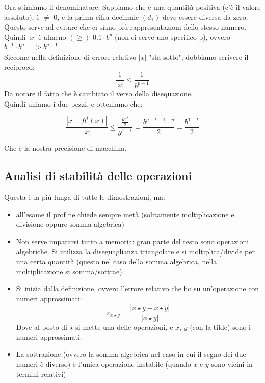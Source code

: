 Ora stimiamo il denominatore. Sappiamo che è una quantità positiva (c'è il valore assoluto), è $\neq$ 0, e la prima cifra decimale $(d_1)$ deve essere diversa da zero. Questo serve ad evitare che ci siano più rappresentazioni dello stesso numero.\\
Quindi $|x|$ è almeno $(\geq)$ $0.1 \cdot b^p$ (non ci serve uno specifico p), ovvero $b^{-1}\cdot b^p => b^{p-1}$.\\
Siccome nella definizione di errore relativo $|x|$ "sta sotto", dobbiamo scrivere il reciproco: 
\begin{displaymath}\frac{1}{|x|}\leq \frac{1}{b^{p-1}}\end{displaymath}
Da notare il fatto che è cambiato il verso della disequazione.\\
Quindi uniamo i due pezzi, e otteniamo che:\\
\begin{center}
    \large\begin{displaymath}
        \frac{|x-fl^t(x)|}{|x|}\leq \frac{\frac{b^{-t}}{2}}{b^{p-1}}= \frac{b^{p-t+1-p}}{2}= \frac{b^{1-t}}{2}
    \end{displaymath}
\end{center}
Che è la nostra precisione di macchina.
\newpage

\subsection{Analisi di stabilità delle operazioni}
Questa è la più lunga di tutte le dimostrazioni, ma:
\begin{itemize}
    \item all'esame il prof ne chiede sempre metà (solitamente moltiplicazione e divisione oppure somma algebrica)
    \item Non serve impararsi tutto a memoria: gran parte del testo sono operazioni algebriche. Si utilizza la diseguaglianza triangolare e si moltiplica/divide per una certa quantità (questo nel caso della somma algebrica, nella moltiplicazione si somma/sottrae).
    \item Si inizia dalla definizione, ovvero l'errore relativo che ho su un'operazione con numeri approssimati:\begin{displaymath}\varepsilon _{x\star y}=\frac{|x\star y - \widetilde{x}\star \widetilde{y}|}{|x \star y|} \end{displaymath}  Dove al posto di $\star$ si mette una delle operazioni, e $\widetilde{x}$, $\widetilde{y}$ (con la tilde) sono i numeri approssimati.
    \item La sottrazione (ovvero la somma algebrica nel caso in cui il segno dei due numeri è diverso) è l'unica operazione instabile (quando $x$ e $y$ sono vicini in termini relativi)
\end{itemize}

